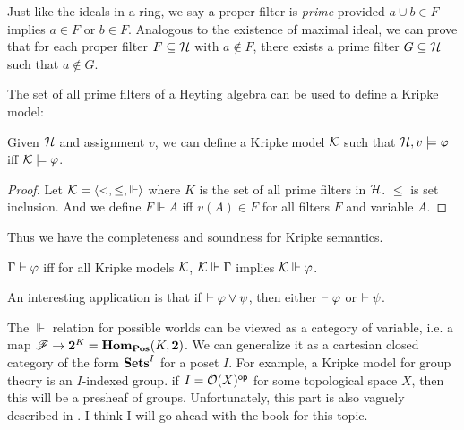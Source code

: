 Just like the ideals in a ring, we say a proper filter is {\it prime}
provided $a\cup b\in F$ implies $a\in F$ or $b\in F$. Analogous to
the existence of maximal ideal, we can prove that for each proper filter
$F\subseteq\mathcal{H}$ with $a\not\in F$, there exists a prime filter
$G\subseteq\mathcal{H}$ such that $a\not\in G$. 

The set of all prime filters of a Heyting algebra can be used to define a
Kripke model:
\begin{lemma}
    Given $\mathcal{H}$ and assignment $v$, we can define a Kripke
    model $\mathcal{K}$ such that $\mathcal{H},v\models \varphi$ iff 
    $\mathcal{K}\models\varphi$.
\end{lemma}
\begin{proof}
    Let $\mathcal{K}=\left<<,\le,\Vdash\right>$ where $K$ is the set of
    all prime filters in $\mathcal{H}$. $\le$ is set inclusion. And
    we define $F\Vdash A$ iff $v(A)\in F$ for all filters $F$ and
    variable $A$. 
\end{proof}

Thus we have the completeness and soundness for Kripke semantics.
\begin{theorem}
    $\Gamma\vdash\varphi$ iff for all Kripke models $\mathcal{K}$,
    $\mathcal{K}\Vdash\Gamma$ implies $\mathcal{K}\Vdash\varphi$.
    \admitted
\end{theorem}

An interesting application is that if $\vdash \varphi\vee\psi$, then
either $\vdash \varphi$ or $\vdash\psi$. 

\null

The $\Vdash$ relation for possible worlds can be viewed as a
category of variable, i.e. a map $\mathscr{F}\to \mathbf{2}^K=
\mathbf{Hom}_{\mathbf{Pos}}(K,\mathbf{2})$. We can generalize it as a
cartesian closed category of the form $\mathbf{Sets}^I$ for a poset $I$. 
For example, a Kripke model for group theory is an $I$-indexed
group. if $I=\mathcal{O}(X)^{\text{\sf op}}$ for some topological space $X$,
then this will be a presheaf of groups. Unfortunately, this
part is also vaguely described in \cite{cat-awodey}. I think
I will go ahead with the book \cite{Introduction-to-higher-order-categorical-logic}
for this topic. 

